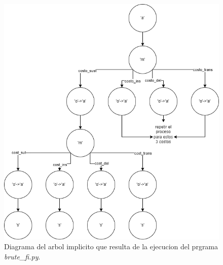   \begin{figure}[H]
    \centering
    \includegraphics[width=0.9\linewidth]{images/ejemplo_fuerza_bruta.png}
    \caption{Diagrama del arbol implicito que resulta de la ejecucion del prgrama \textit{brute\_fi.py}.}
    \label{fig:arbol-fuerza-bruta}
 \end{figure}
 